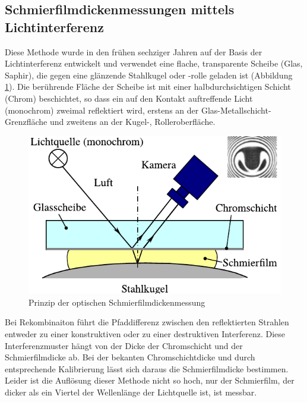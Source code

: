 \subsection{Schmierfilmdickenmessungen mittels Lichtinterferenz}
\label{sub:schmierfilmdickenmessung_mittels_lichtinterferenz}

Diese Methode wurde in den frühen sechziger Jahren auf der Basis der Lichtinterferenz entwickelt und verwendet eine flache, transparente Scheibe (Glas, Saphir), die gegen eine glänzende Stahlkugel oder -rolle geladen ist (Abbildung \ref{fig:ehd_pruefsprinzip_furtuna}).
Die berührende Fläche der Scheibe ist mit einer halbdurchsichtigen Schicht (Chrom) beschichtet, so dass ein auf den Kontakt auftreffende Licht (monochrom) zweimal reflektiert wird, erstens an der Glas-Metallschicht-Grenzfläche und zweitens an der Kugel-, Rolleroberfläche.
\begin{figure}[htb]
    \centering
    \includegraphics[]{./images/ehd_pruefsprinzip_furtuna.pdf}
    \caption{Prinzip der optischen Schmierfilmdickenmessung \cite{furtuna_2011}}
    \label{fig:ehd_pruefsprinzip_furtuna}
\end{figure}
%

Bei Rekombinaiton führt die Pfaddifferenz zwischen den reflektierten Strahlen entweder zu einer konstruktiven oder zu einer destruktiven Interferenz.
Diese Interferenzmuster hängt von der Dicke der Chromschicht und der Schmierfilmdicke ab.
Bei der bekanten Chromschichtdicke und durch entsprechende Kalibrierung lässt sich daraus die Schmierfilmdicke bestimmen.
Leider ist die Auflösung dieser Methode nicht so hoch, nur der Schmierfilm, der dicker als ein Viertel der Wellenlänge der Lichtquelle ist, ist messbar.

